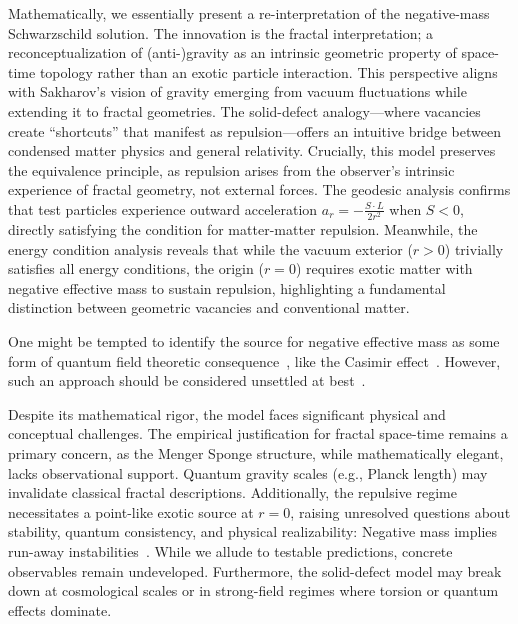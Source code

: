 \documentclass[%
  reprint,
  superscriptaddress,
  showpacs,
  showkeys,
  amsmath,amssymb,
  pra,
  longbibliography,
  floatfix,
]{revtex4-2}
\begin{document}
Mathematically, we essentially present a re-interpretation of the negative-mass Schwarzschild solution.
The innovation is the fractal interpretation;
a reconceptualization of (anti-)gravity as an intrinsic geometric property of space-time topology rather than an exotic particle interaction.
This perspective aligns with Sakharov's vision of gravity emerging from vacuum fluctuations while extending it to fractal geometries.
The solid-defect analogy---where vacancies create ``shortcuts'' that manifest as repulsion---offers an intuitive bridge between condensed matter physics and general relativity. Crucially, this model preserves the equivalence principle, as repulsion arises from the observer's intrinsic experience of fractal geometry, not external forces. The geodesic analysis confirms that test particles experience outward acceleration $a_r = -\frac{S \cdot L}{2r^2}$ when $S < 0$, directly satisfying the condition for matter-matter repulsion. Meanwhile, the energy condition analysis reveals that while the vacuum exterior ($r > 0$) trivially satisfies all energy conditions, the origin ($r = 0$) requires exotic matter with negative effective mass to sustain repulsion, highlighting a fundamental distinction between geometric vacancies and conventional matter.

One might be tempted to identify the source for negative effective mass as some form of quantum field theoretic consequence~\cite{kontou-2020},
like the Casimir effect~\cite{bekenstein-2013,costa-2022}.
However, such an approach should be considered unsettled at best~\cite{Santiago22-PhysRevD.105.064038}.

Despite its mathematical rigor, the model faces significant physical and conceptual challenges.
The empirical justification for fractal space-time remains a primary concern, as the Menger Sponge structure,
while mathematically elegant, lacks observational support.
Quantum gravity scales (e.g., Planck length) may invalidate classical fractal descriptions.
Additionally, the repulsive regime necessitates a point-like exotic source at $r = 0$,
raising unresolved questions about stability, quantum consistency, and physical realizability:
Negative mass implies run-away instabilities~\cite{bondi-1957}.
While we allude to testable predictions, concrete observables remain undeveloped.
Furthermore, the solid-defect model may break down at cosmological scales or in strong-field regimes where torsion or quantum effects dominate.
\end{document}
